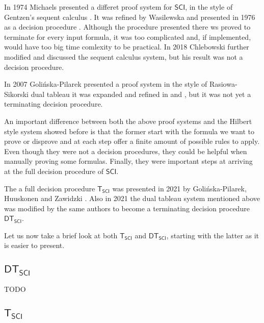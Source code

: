 \documentclass{article}
\theoremstyle{definition}
\theoremstyle{definition}
\theoremstyle{definition}
\theoremstyle{definition}
\theoremstyle{definition}
\newcommand{\SCI}{$\mathsf{SCI}$\xspace}
\newcommand{\TSCI}{$\mathsf{T_{SCI}}$\xspace}
\newcommand{\DTSCI}{$\mathsf{DT_{SCI}}$\xspace}
\begin{document}
In 1974 Michaels presented a differet proof system for \SCI, in the style of
Gentzen's sequent calculus \cite{michaels}. It was refined by Wasilewska and
presented in 1976 as a decision procedure \cite{wasilewska}. Although the
procedure presented there ws proved to terminate for every input formula, it
was too complicated and, if implemented, would have too big time comlexity to
be practical. In 2018 Chlebowski further modified and discussed the sequent
calculus system, but his result was not a decision procedure.

In 2007 Golińska-Pilarek presented a proof system in the style of
Rasiowa-Sikorski dual tableau \cite{jgp_2007} it was expanded and refined in
\cite{jgp_book} and \cite{jgp_2019}, but it was not yet a terminating decision
procedure.

An important difference between both the above proof systems and the Hilbert
style system showed before is that the former start with the formula we want to
prove or disprove and at each step offer a finite amount of possible rules to
apply. Even though they were not a decision procedures, they could be helpful
when manually proving some formulas. Finally, they were important steps at
arriving at the full decision procedure of \SCI.

The a full decision procedure \TSCI was presented in 2021 by Golińska-Pilarek,
Huuskonen and Zawidzki \cite{jgp_t_procedure}. Also in 2021 the dual tableau
system mentioned above was modified by the same authors to become a terminating
decision procedure \DTSCI \cite{jgp_dt_procedure}.

Let us now take a brief look at both \TSCI and \DTSCI, starting with the latter
as it is easier to present.

\subsection{\DTSCI}

TODO

\subsection{\TSCI}
\end{document}
